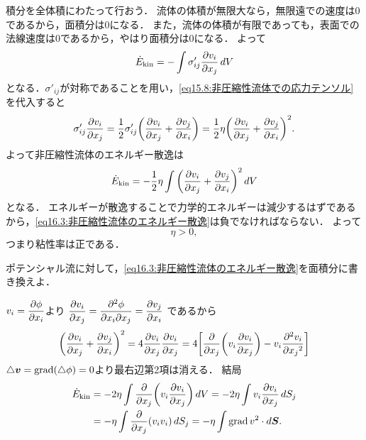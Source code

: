 積分を全体積にわたって行おう．
流体の体積が無限大なら，無限遠での速度は0であるから，面積分は0になる．
また，流体の体積が有限であっても，表面での法線速度は0であるから，やはり面積分は0になる．
よって
\[
    \dot{E}_\mathrm{kin} = - \int \sigma'_{ij} \pdv{v_i}{x_j} \, dV
\]
となる．$\sigma'_{ij}$が対称であることを用い，\eqref{eq15.8:非圧縮性流体での応力テンソル}を代入すると
\[
    \sigma'_{ij} \pdv{v_i}{x_j} = \frac{1}{2} \sigma'_{ij} \pqty{ \pdv{v_i}{x_j} + \pdv{v_j}{x_i} }
    = \frac{1}{2} \eta \pqty{ \pdv{v_i}{x_j} + \pdv{v_j}{x_i} }^2 .
\]
よって非圧縮性流体のエネルギー散逸は
\begin{equation}\label{eq16.3:非圧縮性流体のエネルギー散逸}
    \dot{E}_\mathrm{kin} = -\frac{1}{2} \eta \int \pqty{ \pdv{v_i}{x_j} + \pdv{v_j}{x_i} }^2 \dV
\end{equation}
となる．
エネルギーが散逸することで力学的エネルギーは減少するはずであるから，\eqref{eq16.3:非圧縮性流体のエネルギー散逸}は負でなければならない．
よって
\[
    \eta > 0 ,
\]
つまり粘性率は正である．


\begin{mondai}{}{}
ポテンシャル流に対して，\eqref{eq16.3:非圧縮性流体のエネルギー散逸}を面積分に書き換えよ．
\end{mondai}
\begin{kaitou}
$v_i = \dpdv{\phi}{x_i}$より
$\dpdv{v_i}{x_j} = \dpdv{\phi}{x_i}{x_j} = \dpdv{v_j}{x_i}$
であるから
\[
    \pqty{ \pdv{v_i}{x_j} + \pdv{v_j}{x_i} }^2 = 4 \pdv{v_i}{x_j} \pdv{v_i}{x_j}
    = 4 \bqty{ \pdv{x_j}\pqty{v_i\pdv{v_i}{x_j}} - v_i \pdv[2]{v_i}{{x_j}} }
\]
$\triangle\vb*{v} = \operatorname{grad}(\triangle\phi) = 0$より最右辺第2項は消える．
結局
\begin{align*}
    \dot{E}_\mathrm{kin} &= -2\eta \int \pdv{x_j}\pqty{v_i\pdv{v_i}{x_j}} \dV 
    = -2\eta \int v_i\pdv{v_i}{x_j} \, dS_j \\
    &= -\eta \int \pdv{x_j}(v_iv_i) \, dS_j = -\eta \int \Grad v^2 \cdot \dS .\\
\end{align*}
    
\end{kaitou}

\BackToTheToc